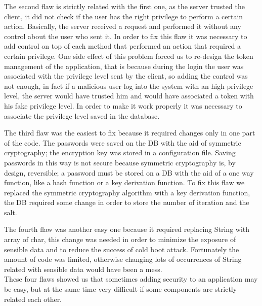 The second flaw is strictly related with the first one, as the server trusted the client, it did not check if the user has the right privilege to perform a certain action.\newline
Basically, the server received a request and performed it without any control about the user who sent it.\newline
In order to fix this flaw it was necessary to add control on top of each method that performed an action that required a certain privilege.\newline
One side effect of this problem forced us to re-design the token management of the application, that is because during the login the user was associated with the privilege level sent by the client, so adding the control was not enough, in fact if a malicious user log into the system with an high privilege level, the server would have trusted him and would have associated a token with his fake privilege level.\newline
In order to make it work properly it was necessary to associate the privilege level saved in the database.\newline

The third flaw was the easiest to fix because it required changes only in one part of the code.\newline
The passwords were saved on the DB with the aid of symmetric cryptography; the encryption key was stored in a configuration file.\newline
Saving passwords in this way is not secure because symmetric cryptography is, by design, reversible; a password must be stored on a DB with the aid of a one way function, like a hash function or a key derivation function.\newline
To fix this flaw we replaced the symmetric cryptography algorithm with a key derivation function, the DB required some change in order to store the number of iteration and the salt.\newline

The fourth flaw was another easy one because it required replacing String with array of char, this change was needed in order to minimize the exposure of sensible data and to reduce the success of cold boot attack.\newline
Fortunately the amount of code was limited, otherwise changing lots of occurrences of String related with sensible data would have been a mess.\\

These four flaws showed us that sometimes adding security to an application may be easy, but at the same time very difficult if some components are strictly related each other.\\

